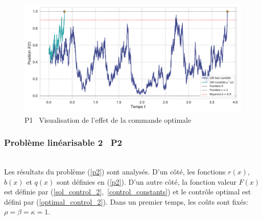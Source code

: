 \begin{figure}[htb]
    \centering
    \includegraphics[width=0.9\linewidth]{img/validation/P1/p1_control_simulation.pdf}
    \caption{P1 \textemdash~Visualisation de l'effet de la commande optimale}
\end{figure}
\FloatBarrier\subsubsection{Problème linéarisable 2 \textemdash~P2}\phantom{}\\
Les résultats du problème (\ref{p2}) sont analysés. D'un côté, les fonctions $r(x)$, $b(x)$ et $q(x)$ sont définies en (\ref{p2}). D'un autre côté, la fonction valeur $F(x)$ est définie par (\ref{sol_control_2},~\ref{control_constants}) et le contrôle optimal est défini par (\ref{optimal_control_2}). Dans un premier temps, les coûts sont fixés: $\rho=\beta=\kappa=1$.
